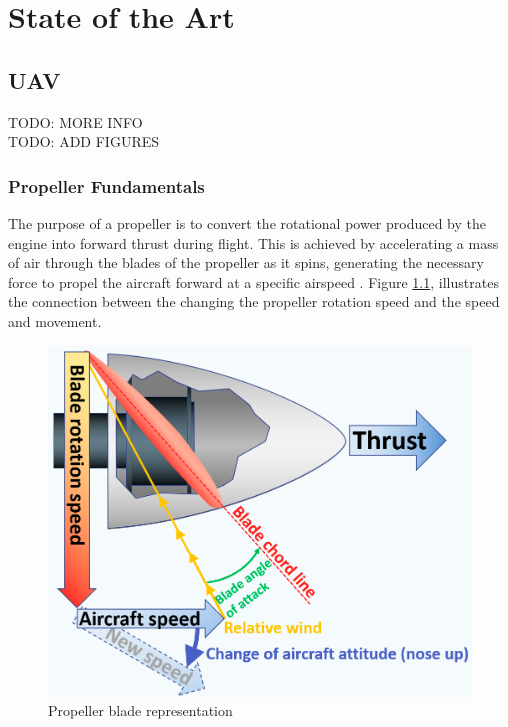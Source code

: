 \chapter{State of the Art} 
\label{chap:Chapter2}
\section{UAV}
TODO: MORE INFO\\
TODO: ADD FIGURES

\subsection{Propeller Fundamentals}
The purpose of a propeller is to convert the rotational power produced by the engine into forward thrust during flight.
This is achieved by accelerating a mass of air through the blades of the propeller as it spins, generating the necessary force to propel the aircraft forward at a specific airspeed \cite{main_uav}.
Figure \ref{fig:propeller}, illustrates the connection between the changing the propeller rotation speed and the speed and movement.

\begin{figure}[H]
    \centering
    \includegraphics[scale=0.25]{ch2/assets/propeller.png}
    \caption{Propeller blade representation \cite{propeller}}
    \label{fig:propeller}
\end{figure}

